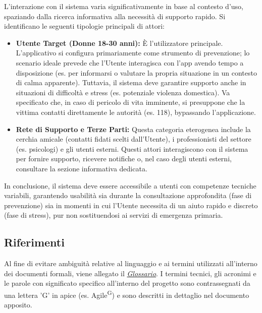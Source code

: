 \documentclass[a4paper,12pt]{article}
\begin{document}
L'interazione con il sistema varia significativamente in base al contesto d'uso, spaziando dalla ricerca informativa alla necessità di supporto rapido. Si identificano le seguenti tipologie principali di attori:

\begin{itemize}
    \item \textbf{Utente Target (Donne 18-30 anni):} È l'utilizzatore principale. L'applicativo si configura primariamente come strumento di prevenzione; lo scenario ideale prevede che l'Utente interagisca con l'app avendo tempo a disposizione (es. per informarsi o valutare la propria situazione in un contesto di calma apparente).
    Tuttavia, il sistema deve garantire supporto anche in situazioni di difficoltà e stress (es. potenziale violenza domestica). Va specificato che, in caso di pericolo di vita imminente, si presuppone che la vittima contatti direttamente le autorità (es. 118), bypassando l'applicazione.
    
    \item \textbf{Rete di Supporto e Terze Parti:} Questa categoria eterogenea include la cerchia amicale (contatti fidati scelti dall'Utente), i professionisti del settore (es. psicologi) e gli utenti esterni. Questi attori interagiscono con il sistema per fornire supporto, ricevere notifiche o, nel caso degli utenti esterni, consultare la sezione informativa dedicata.
\end{itemize}

In conclusione, il sistema deve essere accessibile a utenti con competenze tecniche variabili, garantendo usabilità sia durante la consultazione approfondita (fase di prevenzione) sia in momenti in cui l'Utente necessita di un aiuto rapido e discreto (fase di stress), pur non sostituendosi ai servizi di emergenza primaria.


\subsection{Riferimenti} \label{sec:riferimenti}



Al fine di evitare ambiguità relative al linguaggio e ai termini utilizzati all'interno dei documenti formali, viene allegato il \href{https://swe-bitbybit.github.io/SWE-docs/docs/RTB/documenti_interni/Glossario.pdf}{\textit{Glossario}}.
I termini tecnici, gli acronimi e le parole con significato specifico all'interno del progetto sono contrassegnati da una lettera 'G' in apice (es. Agile\textsuperscript{G}) e sono descritti in dettaglio nel documento apposito.
\end{document}

